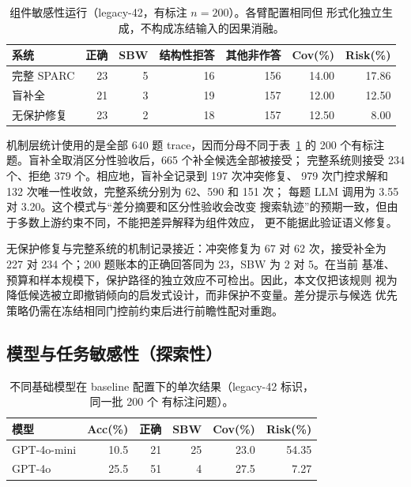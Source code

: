\documentclass[letterpaper]{article}
\newcommand{\method}{SPARC}
\newcommand{\sbw}{SBW}
\begin{document}
\begin{table}[ht]
  \centering
  \caption{组件敏感性运行（legacy-42，有标注 $n=200$）。各臂配置相同但
  形式化独立生成，不构成冻结输入的因果消融。}
  \label{tab:component}
  \small
  \begin{tabular}{lrrrrrr}
    \toprule
    系统 & 正确 & \sbw{} & 结构性拒答 & 其他非作答 & Cov(\%) & Risk(\%) \\
    \midrule
    完整 \method   & 23 & 5 & 16 & 156 & 14.00 & 17.86 \\
    盲补全         & 21 & 3 & 19 & 157 & 12.00 & 12.50 \\
    无保护修复     & 23 & 2 & 18 & 157 & 12.50 & 8.00 \\
    \bottomrule
  \end{tabular}
\end{table}

机制层统计使用的是全部 640 题 trace，因而分母不同于表~\ref{tab:component}
的 200 个有标注题。盲补全取消区分性验收后，665 个补全候选全部被接受；
完整系统则接受 234 个、拒绝 379 个。相应地，盲补全记录到 197 次冲突修复、
979 次门控求解和 132 次唯一性收敛，完整系统分别为 62、590 和 151 次；
每题 LLM 调用为 3.55 对 3.20。这个模式与“差分摘要和区分性验收会改变
搜索轨迹”的预期一致，但由于多数上游约束不同，不能把差异解释为组件效应，
更不能据此验证语义修复。

无保护修复与完整系统的机制记录接近：冲突修复为 67 对 62 次，接受补全为
227 对 234 个；200 题账本的正确回答同为 23，\sbw{} 为 2 对 5。在当前
基准、预算和样本规模下，保护路径的独立效应不可检出。因此，本文仅把该规则
视为降低候选被立即撤销倾向的启发式设计，而非保护不变量。差分提示与候选
优先策略仍需在冻结相同门控前约束后进行前瞻性配对重跑。

\subsection{模型与任务敏感性（探索性）}
\label{sec:gpt4o}

\begin{table}[ht]
  \centering
  \caption{不同基础模型在 baseline 配置下的单次结果（legacy-42 标识，同一批 200 个
  有标注问题）。}
  \label{tab:gpt4o}
  \small
  \begin{tabular}{lrrrrr}
    \toprule
    模型 & Acc(\%) & 正确 & \sbw{} & Cov(\%) & Risk(\%) \\
    \midrule
    GPT-4o-mini & 10.5 & 21 & 25 & 23.0 & 54.35 \\
    GPT-4o      & 25.5 & 51 & 4  & 27.5 & 7.27 \\
    \bottomrule
  \end{tabular}
\end{table}
\end{document}
